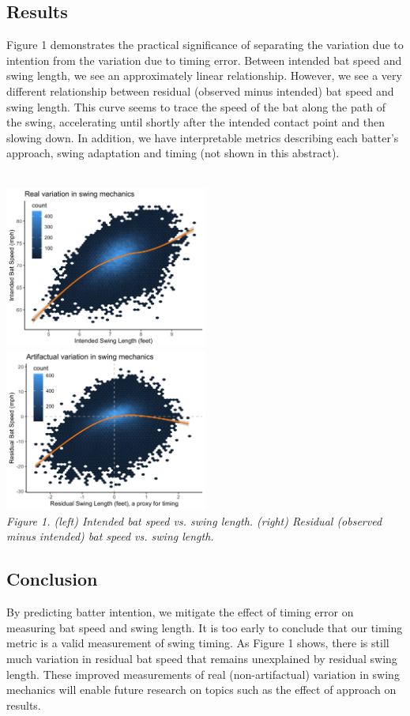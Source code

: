\documentclass{article}
\begin{document}
\subsection*{Results}

Figure 1 demonstrates the practical significance of separating the variation due to intention from the variation due to timing error. Between intended bat speed and swing length, we see an approximately linear relationship. However, we see a very different relationship between residual (observed minus intended) bat speed and swing length. This curve seems to trace the speed of the bat along the path of the swing, accelerating until shortly after the intended contact point and then slowing down. In addition, we have interpretable metrics describing each batter's approach, swing adaptation and timing (not shown in this abstract).

~\\
\includegraphics[width = 0.5\textwidth]{../../figures/intention.png}\hspace{4mm}
\includegraphics[width = 0.5\textwidth]{../../figures/residual.png}\\
{\it\footnotesize Figure 1. (left) Intended bat speed vs. swing length. (right) Residual (observed minus intended) bat speed vs. swing length.}

\subsection*{Conclusion}

By predicting batter intention, we mitigate the effect of timing error on measuring bat speed and swing length. It is too early to conclude that our timing metric is a valid measurement of swing timing. As Figure 1 shows, there is still much variation in residual bat speed that remains unexplained by residual swing length. These improved measurements of real (non-artifactual) variation in swing mechanics will enable future research on topics such as the effect of approach on results.
\end{document}
